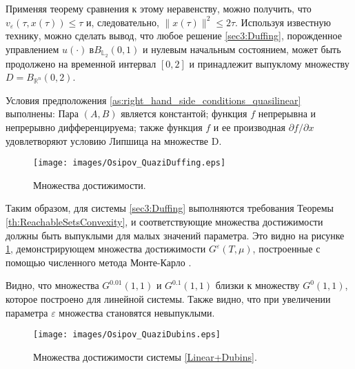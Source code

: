 \documentclass[../main.tex]{subfiles}
\begin{document}
\begin{pr}
    Применяя теорему сравнения к этому неравенству, можно получить, что $v_{\varepsilon}(\tau,x(\tau)) \leqslant \tau$ и, следовательно, $\|x(\tau)\|^2 \leqslant 2 \tau$. 
    Используя известную технику, можно сделать вывод, что любое решение \eqref{sec3:Duffing}, порожденное управлением $u(\cdot)\ в B_{\mathbb{L}_2}(0,1)$ и нулевым начальным состоянием, может быть продолжено на временной интервал $[0,2]$ и принадлежит выпуклому множеству $D = B_{\mathbb{R}^n}(0,2)$.
    
    Условия предположения \ref{as:right_hand_side_conditions_quasilinear} выполнены: Пара $(A,B)$ является константой; функция $f$ непрерывна и непрерывно дифференцируема; также функция $f$ и ее производная $\partial f/\partial x$ удовлетворяют условию Липшица на множестве D.
    
    \begin{figure}[t]
        \centerline{
            \texttt{[image: images/Osipov\_QuaziDuffing.eps]}}
        \caption{Множества достижимости.}
        \label{fig:Duffing}
    \end{figure}
    
    Таким образом, для системы \eqref{sec3:Duffing} выполняются требования Теоремы \ref{th:ReachableSetsConvexity}, и соответствующие множества достижимости должны быть выпуклыми для малых значений параметра. 
    Это видно на рисунке \ref{fig:Duffing}, демонстрирующем множества достижимости $G^{\varepsilon}(T,\mu)$, построенные с помощью численного метода Монте-Карло \cite{Patent,Zykov}.
    
    Видно, что множества $G^{0.01}(1,1) $ и $G^{0.1}(1,1) $ близки к множеству $G^{0}(1,1) $, которое построено для линейной системы. 
    Также видно, что при увеличении параметра $\varepsilon$ множества становятся невыпуклыми. 
    
\end{pr}  %
\begin{figure}[ht]
    \centerline{
        \texttt{[image: images/Osipov\_QuaziDubins.eps]}}
    \caption{Множества достижимости системы \eqref{Linear+Dubins}.}
    \label{fig:LinearDubins}
\end{figure}
\end{document}
